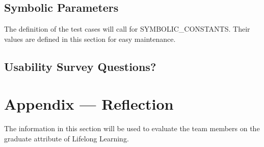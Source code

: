 \documentclass[12pt, titlepage]{article}
\begin{document}

\subsection{Symbolic Parameters}

The definition of the test cases will call for SYMBOLIC\_CONSTANTS.
Their values are defined in this section for easy maintenance.

\subsection{Usability Survey Questions?}


\newpage{}
\section*{Appendix --- Reflection}


The information in this section will be used to evaluate the team members on the
graduate attribute of Lifelong Learning.


\end{document}
